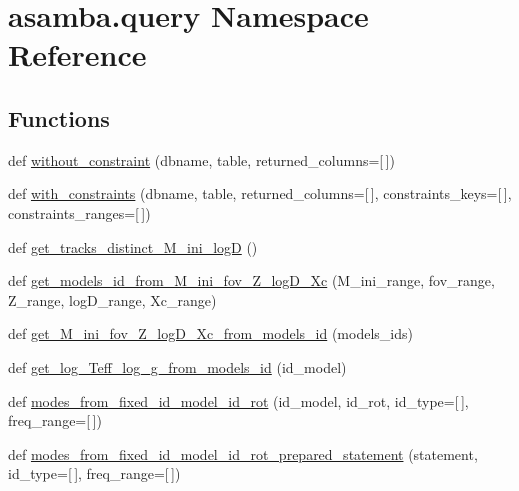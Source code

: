 \hypertarget{namespaceasamba_1_1query}{}\section{asamba.\+query Namespace Reference}
\label{namespaceasamba_1_1query}
\subsection*{Functions}
\begin{DoxyCompactItemize}
\item 
def \hyperlink{namespaceasamba_1_1query_a64b71fbea43ff349dc4d813f35ffa459}{without\+\_\+constraint} (dbname, table, returned\+\_\+columns=\mbox{[}$\,$\mbox{]})
\item 
def \hyperlink{namespaceasamba_1_1query_abaf522b54d321283c1bdc7a688cfb9d2}{with\+\_\+constraints} (dbname, table, returned\+\_\+columns=\mbox{[}$\,$\mbox{]}, constraints\+\_\+keys=\mbox{[}$\,$\mbox{]}, constraints\+\_\+ranges=\mbox{[}$\,$\mbox{]})
\item 
def \hyperlink{namespaceasamba_1_1query_a57abe0b932be64cd2b91fc056a377143}{get\+\_\+tracks\+\_\+distinct\+\_\+\+M\+\_\+ini\+\_\+logD} ()
\item 
def \hyperlink{namespaceasamba_1_1query_ab496b3c36691cb77ea94156037f40f2a}{get\+\_\+models\+\_\+id\+\_\+from\+\_\+\+M\+\_\+ini\+\_\+fov\+\_\+\+Z\+\_\+log\+D\+\_\+\+Xc} (M\+\_\+ini\+\_\+range, fov\+\_\+range, Z\+\_\+range, log\+D\+\_\+range, Xc\+\_\+range)
\item 
def \hyperlink{namespaceasamba_1_1query_a4fa47f5b2cb011771508b4305c159368}{get\+\_\+\+M\+\_\+ini\+\_\+fov\+\_\+\+Z\+\_\+log\+D\+\_\+\+Xc\+\_\+from\+\_\+models\+\_\+id} (models\+\_\+ids)
\item 
def \hyperlink{namespaceasamba_1_1query_a3fb6d746d8c1dde610f066a9b319cc8f}{get\+\_\+log\+\_\+\+Teff\+\_\+log\+\_\+g\+\_\+from\+\_\+models\+\_\+id} (id\+\_\+model)
\item 
def \hyperlink{namespaceasamba_1_1query_abf11bd8e57ec89894fb8b23bef226d1d}{modes\+\_\+from\+\_\+fixed\+\_\+id\+\_\+model\+\_\+id\+\_\+rot} (id\+\_\+model, id\+\_\+rot, id\+\_\+type=\mbox{[}$\,$\mbox{]}, freq\+\_\+range=\mbox{[}$\,$\mbox{]})
\item 
def \hyperlink{namespaceasamba_1_1query_a48eceec8dc6ed89e2916e155f3cd16a6}{modes\+\_\+from\+\_\+fixed\+\_\+id\+\_\+model\+\_\+id\+\_\+rot\+\_\+prepared\+\_\+statement} (statement, id\+\_\+type=\mbox{[}$\,$\mbox{]}, freq\+\_\+range=\mbox{[}$\,$\mbox{]})
\end{DoxyCompactItemize}
